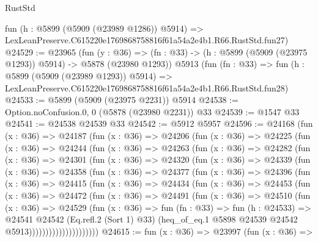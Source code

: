 \begin{lexlean}{RustStd}
\begin{coremodule}
{{    fun (h : @5899 (@5909 (@23989 @1286)) @5914) =>
    LexLeanPreserve.C615220e1769868758816f61a54a2e4b1.R66.RustStd.fun27)
@24529 := @23965
    (fun (y : @36) =>
    (fn : @33) -> (h : @5899 (@5909 (@23975 @1293)) @5914) -> @5878 (@23980 @1293))
    @5913
    (fun (fn : @33) =>
    fun (h : @5899 (@5909 (@23989 @1293)) @5914) =>
    LexLeanPreserve.C615220e1769868758816f61a54a2e4b1.R66.RustStd.fun28)
@24533 := @5899 (@5909 (@23975 @2231)) @5914
@24538 := Option.noConfusion.{0, 0} (@5878 (@23980 @2231)) @33
@24539 := @1547 @33
@24541 := @24538 @24539 @33
@24542 := @5912 @5957
@24596 := @24168
    (fun (x : @36) =>
    @24187
      (fun (x : @36) =>
      @24206
        (fun (x : @36) =>
        @24225
          (fun (x : @36) =>
          @24244
            (fun (x : @36) =>
            @24263
              (fun (x : @36) =>
              @24282
                (fun (x : @36) =>
                @24301
                  (fun (x : @36) =>
                  @24320
                    (fun (x : @36) =>
                    @24339
                      (fun (x : @36) =>
                      @24358
                        (fun (x : @36) =>
                        @24377
                          (fun (x : @36) =>
                          @24396
                            (fun (x : @36) =>
                            @24415
                              (fun (x : @36) =>
                              @24434
                                (fun (x : @36) =>
                                @24453
                                  (fun (x : @36) =>
                                  @24472
                                    (fun (x : @36) =>
                                    @24491
                                      (fun (x : @36) =>
                                      @24510
                                        (fun (x : @36) =>
                                        @24529
                                          (fun (x : @36) =>
                                          fun (fn : @33) =>
                                          fun (h : @24533) =>
                                          @24541
                                            @24542
                                            (Eq.refl.{2} (Sort 1) @33)
                                            (heq_of_eq.{1}
                                              @5898
                                              @24539
                                              @24542
                                              @5913)))))))))))))))))))))
@24615 := fun (x : @36) =>
  @23997
    (fun (x : @36) =>
}}
\end{coremodule}
\end{lexlean}
